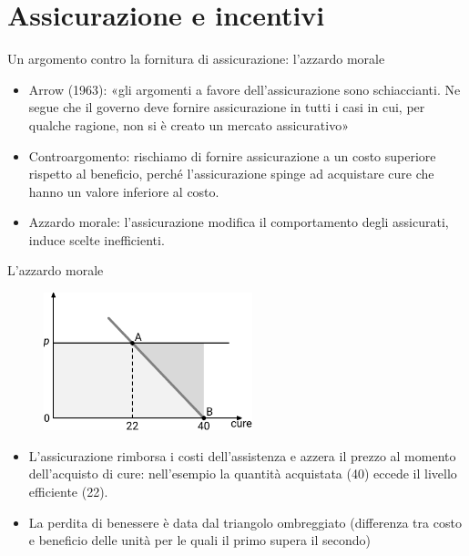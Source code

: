 \documentclass[aspectratio=149,11pt]{beamer}
\begin{document}
\section{Assicurazione e incentivi}

\begin{frame}{Un argomento contro la fornitura di assicurazione: l'azzardo morale}
\begin{itemize}
\item Arrow (1963): «gli argomenti a favore dell'assicurazione sono
schiaccianti. Ne segue che il governo deve fornire assicurazione in tutti i
casi in cui, per qualche ragione, non si è creato un mercato assicurativo»
\item Controargomento: rischiamo di fornire assicurazione a un costo superiore
rispetto al beneficio, perché l'assicurazione spinge ad acquistare cure che
hanno un valore inferiore al costo.
\item \alert{Azzardo morale}: l'assicurazione modifica il comportamento degli
assicurati, induce scelte inefficienti.
\end{itemize}
\end{frame}

\begin{frame}{L'azzardo morale}
\begin{figure}[htbp]
\centering
\includegraphics[height=4cm]{./figure/moral-hazard-2.pdf}
\end{figure}

\begin{itemize}
\item L'assicurazione rimborsa i costi dell'assistenza e azzera il prezzo al
momento dell'acquisto di cure: nell'esempio la quantità acquistata (40)
eccede il livello efficiente (22).
\item La perdita di benessere è data dal triangolo ombreggiato (differenza tra
costo e beneficio delle unità per le quali il primo supera il secondo)
\end{itemize}
\end{frame}
\end{document}
